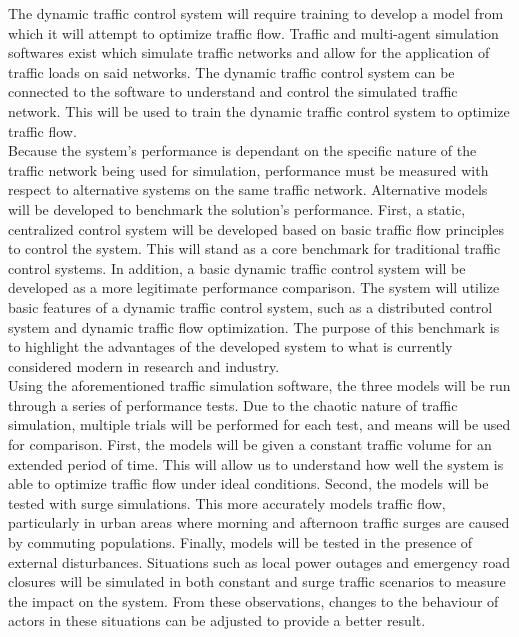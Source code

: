 \documentclass{article}
\begin{document}
The dynamic traffic control system will require training to develop a model from which it will attempt to optimize traffic flow.
Traffic and multi-agent simulation softwares exist which simulate traffic networks and allow for the application of traffic loads on said networks.
The dynamic traffic control system can be connected to the software to understand and control the simulated traffic network.
This will be used to train the dynamic traffic control system to optimize traffic flow.\\

Because the system's performance is dependant on the specific nature of the traffic network being used for simulation, performance must be measured with respect to alternative systems on the same traffic network.
Alternative models will be developed to benchmark the solution's performance.
First, a static, centralized control system will be developed based on basic traffic flow principles to control the system.
This will stand as a core benchmark for traditional traffic control systems.
In addition, a basic dynamic traffic control system will be developed as a more legitimate performance comparison.
The system will utilize basic features of a dynamic traffic control system, such as a distributed control system and dynamic traffic flow optimization.
The purpose of this benchmark is to highlight the advantages of the developed system to what is currently considered modern in research and industry.\\

Using the aforementioned traffic simulation software, the three models will be run through a series of performance tests.
Due to the chaotic nature of traffic simulation, multiple trials will be performed for each test, and means will be used for comparison.
First, the models will be given a constant traffic volume for an extended period of time.
This will allow us to understand how well the system is able to optimize traffic flow under ideal conditions.
Second, the models will be tested with surge simulations.
This more accurately models traffic flow, particularly in urban areas where morning and afternoon traffic surges are caused by commuting populations.
Finally, models will be tested in the presence of external disturbances.
Situations such as local power outages and emergency road closures will be simulated in both constant and surge traffic scenarios to measure the impact on the system.
From these observations, changes to the behaviour of actors in these situations can be adjusted to provide a better result.\\
\end{document}
